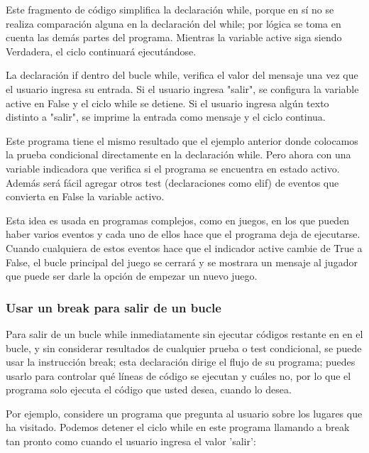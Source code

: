 	Este fragmento de código simplifica la declaración {\ttfamily while},  porque  en sí no se realiza comparación alguna en la declaración del {\ttfamily  while}; por lógica se toma en cuenta las demás partes del programa. Mientras la variable {\ttfamily active}  siga siendo Verdadera, el ciclo continuará ejecutándose.
	
	
	La declaración {\ttfamily if} dentro del bucle {\ttfamily while}, verifica el valor del mensaje una vez que el usuario ingresa su entrada. Si el usuario ingresa "salir",  se configura la variable {\ttfamily active} en {\ttfamily False} y el ciclo {\ttfamily while} se detiene. Si el usuario ingresa algún texto distinto a "salir",  { }se imprime la entrada como mensaje y  el ciclo continua.
	
	Este programa tiene el mismo resultado que el ejemplo anterior donde colocamos la prueba condicional directamente en la declaración {\ttfamily while}. Pero ahora con una variable indicadora  que  verifica si el programa se encuentra en estado {\ttfamily activo}. Además será  fácil agregar otros  test (declaraciones como {\ttfamily  elif}) de eventos que convierta en {\ttfamily False} la variable {\ttfamily activo}.
	
	
	Esta idea es usada en programas complejos, como en juegos, en los que pueden haber varios eventos y cada uno de ellos hace que el programa deja de ejecutarse. Cuando cualquiera de estos eventos hace que el indicador  {\ttfamily active} cambie de {\ttfamily True} a  {\ttfamily False}, el bucle principal del juego se cerrará y se  mostrara un mensaje al jugador que  puede ser darle la opción de empezar un nuevo juego.
	
	
	\subsubsection{Usar un {\ttfamily break} para salir de un bucle} 
	
	
	Para salir de un bucle {\ttfamily while} inmediatamente sin ejecutar códigos restante en
	en el bucle, y sin considerar resultados de cualquier prueba o test condicional, se puede usar la  instrucción {\ttfamily break}; esta declaración  dirige el flujo de su programa; puedes usarlo
	para controlar qué líneas de código se ejecutan y cuáles no, por lo que el programa
	solo ejecuta el código que usted desea, cuando lo desea.
	
	Por ejemplo, considere un programa que pregunta al usuario sobre los lugares que ha visitado.
	Podemos detener el ciclo {\ttfamily while} en este programa llamando a {\ttfamily break} tan pronto como
	cuando el usuario ingresa el valor 'salir':
	
